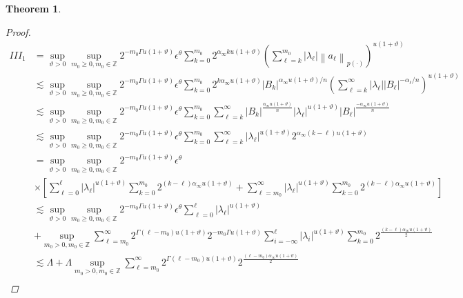\documentclass[oneside,reqno]{amsart}
\newtheorem{theorem}{Theorem}[section]
\numberwithin{equation}{section}
\theoremstyle{definition}
\begin{document}
\begin{theorem}
\begin{proof}
\begin{align*}
I I I_{1}&=\sup_{\vartheta>0 }\sup _{m_0\geq 0, m_0\in  \mathbb{Z}} 2^{-m_0\Gamma u(1+\vartheta)} \epsilon  ^\theta \sum_{k=0}^{m_0} 2^{ \alpha_{\infty} k u(1+\vartheta)}\left(\sum_{\ell=k}^{m_0}\left|\lambda_\ell \right|\left\|a_\ell \right\|_{{p(\cdot)}}\right)^{u(1+\vartheta)} \\
& \lesssim\sup_{\vartheta>0 }\sup _{m_0\geq 0, m_0\in  \mathbb{Z}} 2^{-m_0\Gamma u(1+\vartheta)} \epsilon  ^\theta \sum_{k=0}^{m_0} 2^{k  \alpha_{\infty}u(1+\vartheta)}\left|B_{k}\right|^{\alpha_{\infty} u(1+\vartheta) / n}\left(\sum_{\ell=k}^{\infty}\left|\lambda_\ell \right|\left|B_\ell \right|^{-\alpha_\ell  / n}\right)^{u(1+\vartheta)} \\
& \lesssim \sup_{\vartheta>0 }\sup _{m_0\geq 0, m_0\in  \mathbb{Z}} 2^{-m_0\Gamma u(1+\vartheta)} \epsilon  ^\theta  \sum_{k=0}^{m_0} \sum_{\ell=k}^{\infty}\left|B_{k}\right|^{\frac{\alpha_{\infty} u(1+\vartheta)} {n}}\left|\lambda_\ell \right|^{u(1+\vartheta)}\left|B_\ell \right|^{\frac{-\alpha_{\infty}u(1+\vartheta) }{ n}} \\
& \lesssim \sup_{\vartheta>0 }\sup _{m_0\geq 0, m_0\in  \mathbb{Z}} 2^{-m_0\Gamma u(1+\vartheta)} \epsilon  ^\theta \sum_{k=0}^{m_0} \sum_{\ell=k}^{\infty}\left|\lambda_\ell \right|^{u(1+\vartheta)} 2^{\alpha_{\infty}(k-\ell)  u(1+\vartheta)} \\
& =\sup_{\vartheta>0 }\sup _{m_0\geq 0, m_0\in  \mathbb{Z}} 2^{-m_0\Gamma u(1+\vartheta)} \epsilon  ^\theta \\
& \times\left[\sum_{\ell=0}^{\ell }\left|\lambda_\ell \right|^{u(1+\vartheta)} \sum_{k=0}^{m_0} 2^{(k-\ell) \alpha_{\infty} u(1+\vartheta)}+\sum_{\ell=m_0}^{\infty}\left|\lambda_\ell \right|^{u(1+\vartheta)} \sum_{k=0}^{m_0} 2^{(k-\ell) \alpha_{\infty} u(1+\vartheta)}\right] \\
& \lesssim\sup_{\vartheta>0 }\sup _{m_0\geq 0, m_0\in  \mathbb{Z}} 2^{-m_0\Gamma u(1+\vartheta)} \epsilon  ^\theta \sum_{\ell=0}^{\ell }\left|\lambda_\ell \right|^{u(1+\vartheta)} \\
& +\sup _{m_0>0, m_0\in  \mathbb{Z} } \sum_{\ell=m_0}^{\infty} 2^{\Gamma(\ell-m_0)u(1+\vartheta)} 2^{-m_0\Gamma u(1+\vartheta)} \sum_{i=-\infty}^{\ell }\left|\lambda_{i}\right|^{u(1+\vartheta)} \sum_{k=0}^{m_0} 2^{\frac{(k-\ell) \alpha_{\infty} u(1+\vartheta)} {2}} \\
& \lesssim \Lambda+\Lambda \sup _{m_0>0, m_0\in  \mathbb{Z}} \sum_{\ell=m_0}^{\infty} 2^{\Gamma(\ell-m_0)u(1+\vartheta)} 2^{\frac{(\ell-m_0) \alpha_{\infty} u(1+\vartheta)} {2}} \\

\end{align*}
\end{proof}
\end{theorem}
\end{document}
